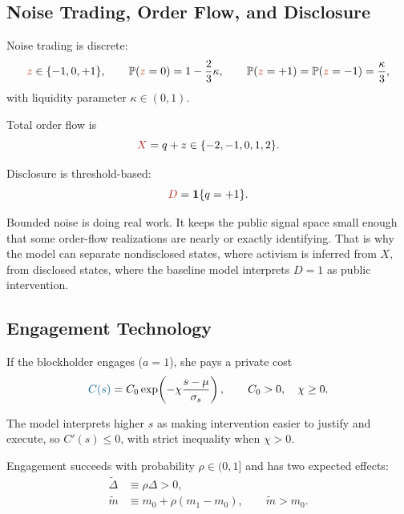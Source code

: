 \documentclass[11pt,a4paper]{article}
\theoremstyle{definition}
\theoremstyle{plain}
\theoremstyle{remark}
\newcommand{\PP}{\mathbb{P}}
\newcommand{\1}{\mathbf{1}}
\newcommand{\choice}[1]{{\color{MidnightBlue}#1}}
\newcommand{\obs}[1]{{\color{BrickRed}#1}}
\begin{document}
\subsection{Noise Trading, Order Flow, and Disclosure}

Noise trading is discrete:
\begin{equation}
\obs{z} \in \{-1,0,+1\},
\qquad
\PP(\obs{z}=0)=1-\frac{2}{3}\kappa,
\qquad
\PP(\obs{z}=+1)=\PP(\obs{z}=-1)=\frac{\kappa}{3},
\label{eq:noise}
\end{equation}
with liquidity parameter $\kappa \in (0,1)$.

Total order flow is
\begin{equation}
\obs{X} = q + z \in \{-2,-1,0,1,2\}.
\label{eq:order-flow}
\end{equation}

Disclosure is threshold-based:
\begin{equation}
\obs{D} = \1\{q=+1\}.
\label{eq:disclosure}
\end{equation}

\begin{econbox}
Bounded noise is doing real work. It keeps the public signal space small enough that some order-flow realizations are nearly or exactly identifying. That is why the model can separate nondisclosed states, where activism is inferred from \obs{$X$}, from disclosed states, where the baseline model interprets \obs{$D=1$} as public intervention.
\end{econbox}

\subsection{Engagement Technology}

If the blockholder engages ($a=1$), she pays a private cost
\begin{equation}
\choice{C(s)} = C_0 \exp\!\left(-\chi\frac{s-\mu}{\sigma_s}\right),
\qquad
C_0>0,
\quad
\chi \ge 0.
\label{eq:cost}
\end{equation}

The model interprets higher $s$ as making intervention easier to justify and execute, so $C'(s)\le 0$, with strict inequality when $\chi>0$.

Engagement succeeds with probability $\rho \in (0,1]$ and has two expected effects:
\begin{align}
\tilde{\Delta} &\equiv \rho \Delta > 0,
\label{eq:tilde-delta} \\
\tilde m &\equiv m_0 + \rho(m_1-m_0),
\qquad
\tilde m > m_0.
\label{eq:tilde-m}
\end{align}
\end{document}
